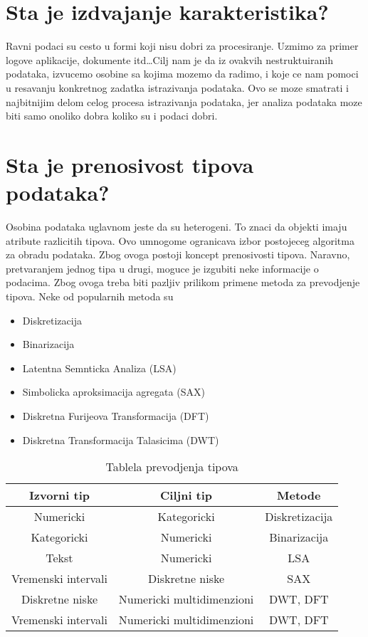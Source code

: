 \documentclass[a4paper]{article}
\begin{document}
\section{Sta je izdvajanje karakteristika?}
Ravni podaci su cesto u formi koji nisu dobri za procesiranje. Uzmimo za primer logove aplikacije,
dokumente itd\ldots Cilj nam je da iz ovakvih nestruktuiranih podataka, izvucemo osobine sa kojima
mozemo da radimo, i koje ce nam pomoci u resavanju konkretnog zadatka istrazivanja podataka. Ovo
se moze smatrati i najbitnijim delom celog procesa istrazivanja podataka, jer analiza podataka moze
biti samo onoliko dobra koliko su i podaci dobri.


\section{Sta je prenosivost tipova podataka?}
Osobina podataka uglavnom jeste da su heterogeni. To znaci da objekti imaju atribute razlicitih
tipova. Ovo umnogome ogranicava izbor postojeceg algoritma za obradu podataka. Zbog ovoga postoji
koncept prenosivosti tipova. Naravno, pretvaranjem jednog tipa u drugi, moguce je izgubiti neke
informacije o podacima. Zbog ovoga treba biti pazljiv prilikom primene metoda za prevodjenje tipova.
Neke od popularnih metoda su

\begin{itemize}
    \item Diskretizacija
    \item Binarizacija
    \item Latentna Semnticka Analiza (LSA)
    \item Simbolicka aproksimacija agregata (SAX)
    \item Diskretna Furijeova Transformacija (DFT)
    \item Diskretna Transformacija Talasicima (DWT)
\end{itemize}

\begin{table}[H]
    \centering
    \caption{Tablela prevodjenja tipova}
    \begin{tabular}{||c|c|c||}
        \hline
        \textbf{Izvorni tip} & \textbf{Ciljni tip} & \textbf{Metode} \\ \hline \hline
        Numericki & Kategoricki & Diskretizacija \\ \hline
        Kategoricki & Numericki & Binarizacija \\ \hline 
        Tekst & Numericki & LSA \\ \hline
        Vremenski intervali & Diskretne niske & SAX \\ \hline
        Diskretne niske & Numericki multidimenzioni & DWT, DFT \\ \hline
        Vremenski intervali & Numericki multidimenzioni & DWT, DFT \\ \hline \hline
    \end{tabular}
\end{table} 
\end{document}
